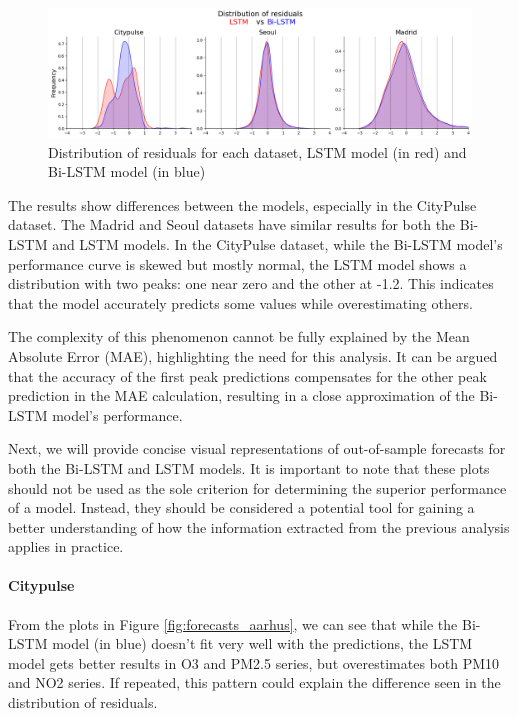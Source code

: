 \begin{figure}
    \centering
    \includegraphics[width=1\linewidth]{images/Results/Residuals_distribution.png}
    \caption{Distribution of residuals for each dataset, LSTM model (in red) and Bi-LSTM model (in blue)}
    \label{fig:kde_residuals}
\end{figure}

The results show differences between the models, especially in the CityPulse dataset. The Madrid and Seoul datasets have similar results for both the Bi-LSTM and LSTM models. In the CityPulse dataset, while the Bi-LSTM model's performance curve is skewed but mostly normal, the LSTM model shows a distribution with two peaks: one near zero and the other at -1.2. This indicates that the model accurately predicts some values while overestimating others.

The complexity of this phenomenon cannot be fully explained by the Mean Absolute Error (MAE), highlighting the need for this analysis. It can be argued that the accuracy of the first peak predictions compensates for the other peak prediction in the MAE calculation, resulting in a close approximation of the Bi-LSTM model's performance.

Next, we will provide concise visual representations of out-of-sample forecasts for both the Bi-LSTM and LSTM models. It is important to note that these plots should not be used as the sole criterion for determining the superior performance of a model. Instead, they should be considered a potential tool for gaining a better understanding of how the information extracted from the previous analysis applies in practice.

\paragraph{Citypulse}
From the plots in Figure \ref{fig:forecasts_aarhus}, we can see that while the Bi-LSTM model (in blue) doesn't fit very well with the predictions, the LSTM model gets better results in O3 and PM2.5 series, but overestimates both PM10 and NO2 series. If repeated, this pattern could explain the difference seen in the distribution of residuals.

